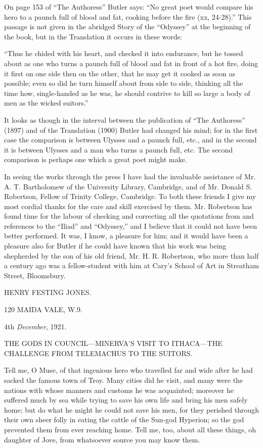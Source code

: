 On page 153 of “The Authoress” Butler says: “No great poet would compare his
hero to a paunch full of blood and fat, cooking before the fire (xx, 24-28).”
This passage is not given in the abridged Story of the “Odyssey” at the
beginning of the book, but in the Translation it occurs in these words:

“Thus he chided with his heart, and checked it into endurance, but he tossed
about as one who turns a paunch full of blood and fat in front of a hot fire,
doing it first on one side then on the other, that he may get it cooked as soon
as possible; even so did he turn himself about from side to side, thinking all
the time how, single-handed as he was, he should contrive to kill so large a
body of men as the wicked suitors.”

It looks as though in the interval between the publication of “The Authoress”
(1897) and of the Translation (1900) Butler had changed his mind; for in the
first case the comparison is between Ulysses and a paunch full, etc., and in
the second it is between Ulysses and a man who turns a paunch full, etc. The
second comparison is perhaps one which a great poet might make.

In seeing the works through the press I have had the invaluable assistance of
Mr. A. T. Bartholomew of the University Library, Cambridge, and of Mr. Donald
S. Robertson, Fellow of Trinity College, Cambridge. To both these friends I
give my most cordial thanks for the care and skill exercised by them. Mr.
Robertson has found time for the labour of checking and correcting all the
quotations from and references to the “Iliad” and “Odyssey,” and I believe that
it could not have been better performed. It was, I know, a pleasure for him;
and it would have been a pleasure also for Butler if he could have known that
his work was being shepherded by the son of his old friend, Mr. H. R.
Robertson, who more than half a century ago was a fellow-student with him at
Cary’s School of Art in Streatham Street, Bloomsbury.

HENRY FESTING JONES.

120 MAIDA VALE, W.9.

4th \emph{December}, 1921.


THE GODS IN COUNCIL—MINERVA’S VISIT TO ITHACA—THE CHALLENGE FROM TELEMACHUS TO
THE SUITORS.

Tell me, O Muse, of that ingenious hero who travelled far and wide after he had
sacked the famous town of Troy. Many cities did he visit, and many were the
nations with whose manners and customs he was acquainted; moreover he suffered
much by sea while trying to save his own life and bring his men safely home;
but do what he might he could not save his men, for they perished through their
own sheer folly in eating the cattle of the Sun-god Hyperion; so the god
prevented them from ever reaching home. Tell me, too, about all these things,
oh daughter of Jove, from whatsoever source you may know them.

